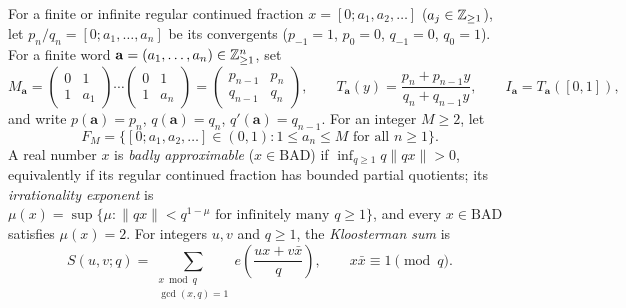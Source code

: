 \documentclass[11pt]{article}
\newcommand{\dist}[1]{\lVert #1\rVert}
\newcommand{\BAD}{\mathrm{BAD}}
\begin{document}
For a finite or infinite regular continued fraction $x=[0;a_1,a_2,\dots]$ ($a_j\in\mathbb Z_{\ge1}$), let $p_n/q_n=[0;a_1,\dots,a_n]$ be its convergents ($p_{-1}=1$, $p_0=0$, $q_{-1}=0$, $q_0=1$). For a finite word $\mathbf{a}=(a_1,\dots,a_n)\in\mathbb Z_{\ge1}^n$, set
\begin{equation}\label{eq:cf-matrix}
M_{\mathbf{a}}=\begin{pmatrix}0&1\\1&a_1\end{pmatrix}\cdots\begin{pmatrix}0&1\\1&a_n\end{pmatrix}=\begin{pmatrix}p_{n-1}&p_n\\q_{n-1}&q_n\end{pmatrix},\qquad
T_{\mathbf{a}}(y)=\frac{p_n+p_{n-1}y}{q_n+q_{n-1}y},\qquad
I_{\mathbf{a}}=T_{\mathbf{a}}([0,1]),
\end{equation}
and write $p(\mathbf{a})=p_n$, $q(\mathbf{a})=q_n$, $q'(\mathbf{a})=q_{n-1}$. For an integer $M\ge2$, let
\[
F_M=\bigl\{[0;a_1,a_2,\dots]\in(0,1):1\le a_n\le M\text{ for all }n\ge1\bigr\}.
\]
A real number $x$ is \emph{badly approximable} ($x\in\BAD$) if $\inf_{q\ge1}q\dist{qx}>0$, equivalently if its regular continued fraction has bounded partial quotients; its \emph{irrationality exponent} is $\mu(x)=\sup\{\mu:\dist{qx}<q^{1-\mu}\text{ for infinitely many }q\ge1\}$, and every $x\in\BAD$ satisfies $\mu(x)=2$. For integers $u,v$ and $q\ge1$, the \emph{Kloosterman sum} is
\[
S(u,v;q)=\sum_{\substack{x\bmod q\\\gcd(x,q)=1}}e\!\left(\frac{ux+v\bar x}{q}\right),\qquad x\bar x\equiv1\pmod q.
\]
\end{document}
